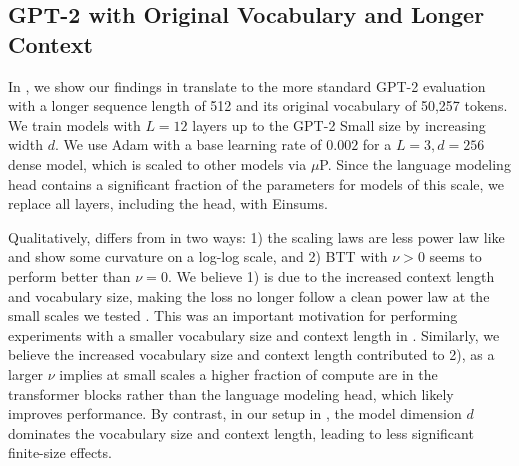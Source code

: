 \documentclass{article}
\newcommand{\mup}{$\mu$P}
\begin{document}
\subsection{GPT-2 with Original Vocabulary and Longer Context}
In , we show our findings in  translate to the more standard GPT-2 evaluation with a longer sequence length of 512 and its original vocabulary of 50,257 tokens. We train models with $L=12$ layers up to the GPT-2 Small \citep{radford2019gpt2} size by increasing width $d$. We use Adam with a base learning rate of $0.002$ for a $L=3, d=256$ dense model, which is scaled to other models via \mup. Since the language modeling head contains a significant fraction of the parameters for models of this scale, we replace all layers, including the head, with Einsums.

Qualitatively,  differs from  in two ways: 1) the scaling laws are less power law like and show some curvature on a log-log scale, and 2) BTT with $\nu > 0$ seems to perform better than $\nu=0.$ We believe 1) is due to the increased context length and vocabulary size, making the loss no longer follow a clean power law at the small scales we tested \citep{kaplan2020scaling,henighan2020scaling}. This was an important motivation for performing experiments with a smaller vocabulary size and context length in . Similarly, we believe the increased vocabulary size and context length contributed to 2), as a larger $\nu$ implies at small scales a higher fraction of compute are in the transformer blocks rather than the language modeling head, which likely improves performance. By contrast, in our setup in , the model dimension $d$ dominates the vocabulary size and context length, leading to less significant finite-size effects.
\end{document}

